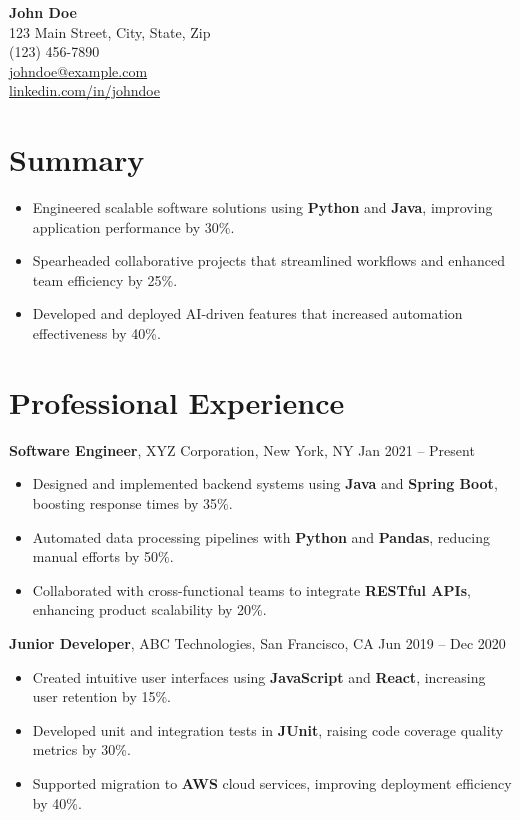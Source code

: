 \documentclass[a4paper,10pt]{article}
\begin{document}
\begin{center}
    {\LARGE \textbf{John Doe}}\\
    123 Main Street, City, State, Zip \\
    (123) 456-7890 \\
    \href{mailto:johndoe@example.com}{johndoe@example.com} \\
    \href{https://linkedin.com/in/johndoe}{linkedin.com/in/johndoe}
\end{center}

\vspace{0.5cm}

\section*{Summary}
\begin{itemize}[leftmargin=*, noitemsep]
    \item Engineered scalable software solutions using \textbf{Python} and \textbf{Java}, improving application performance by 30\%.
    \item Spearheaded collaborative projects that streamlined workflows and enhanced team efficiency by 25\%.
    \item Developed and deployed AI-driven features that increased automation effectiveness by 40\%.
\end{itemize}

\section*{Professional Experience}

\textbf{Software Engineer}, XYZ Corporation, New York, NY \hfill Jan 2021 -- Present
\begin{itemize}[leftmargin=*, noitemsep]
    \item Designed and implemented backend systems using \textbf{Java} and \textbf{Spring Boot}, boosting response times by 35\%.
    \item Automated data processing pipelines with \textbf{Python} and \textbf{Pandas}, reducing manual efforts by 50\%.
    \item Collaborated with cross-functional teams to integrate \textbf{RESTful APIs}, enhancing product scalability by 20\%.
\end{itemize}

\textbf{Junior Developer}, ABC Technologies, San Francisco, CA \hfill Jun 2019 -- Dec 2020
\begin{itemize}[leftmargin=*, noitemsep]
    \item Created intuitive user interfaces using \textbf{JavaScript} and \textbf{React}, increasing user retention by 15\%.
    \item Developed unit and integration tests in \textbf{JUnit}, raising code coverage quality metrics by 30\%.
    \item Supported migration to \textbf{AWS} cloud services, improving deployment efficiency by 40\%.
\end{itemize}
\end{document}
